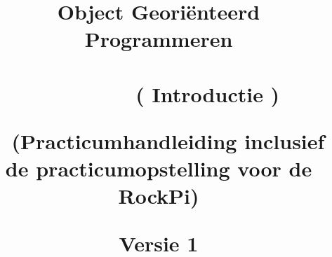 \documentclass[12pt,openright,twoside]{report}
\date{}
\title{
	
	{\vspace{-4cm}}
	
	{\hspace{-20pt}\begin{bfseries}\LARGE{\color{black}Object Georiënteerd Programmeren  \\ ~ \\ ~~~~~~~~ ( Introductie )} \end{bfseries}  } 
	\newline ~ \newline
	\small{(Practicumhandleiding inclusief de practicumopstelling voor de RockPi)}
	\ThisCenterWallPaper{0.8}{figuren/frontRock.png}
	
	{Versie 1}
	
	{\vspace{12cm}}	
	{\color{white}  
		\raggedleft  \par}
	
}
\begin{document}
	
	
	\maketitle
	
	\tableofcontents
	
	\let\cleardoublepage\clearpage
	
	
	
	
	
	
	
	
	\begin{comment}
	\maketitle
	
	
	\tableofcontents
	
	\let\cleardoublepage\clearpage
	\let\cleardoublepage\clearpage
	
	
%	
	\let\cleardoublepage\relax
%	

	
	
	
	
	
	\end{comment}
\end{document}
